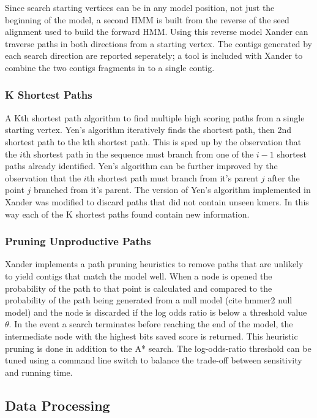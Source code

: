 \documentclass[10pt]{bmc_article}
\newenvironment{bmcformat}{\begin{raggedright}\baselineskip20pt\sloppy\setboolean{publ}{false}}{\end{raggedright}\baselineskip20pt\sloppy}
\begin{document}
\begin{bmcformat}
Since search starting vertices can be in any model position, not just the beginning of the model, a second HMM is built from the reverse of the seed alignment used to build the forward HMM.  Using this reverse model Xander can traverse paths in both directions from a starting vertex.  The contigs generated by each search direction are reported seperately; a tool is included with Xander to combine the two contigs fragments in to a single contig.

\subsubsection*{K Shortest Paths}
A Kth shortest path algorithm\cite{yen_finding_1971} to find multiple high scoring paths from a single starting vertex.  Yen's algorithm iteratively finds the shortest path, then 2nd shortest path to the kth shortest path.  This is sped up by the observation that the $i$th shortest path in the sequence must branch from one of the $i-1$ shortest paths already identified.  Yen's algorithm can be further improved by the observation that the $i$th shortest path must branch from it's parent $j$ after the point $j$ branched from it's parent\cite{lawler_procedure_1972}.  The version of Yen's algorithm implemented in Xander was modified to discard paths that did not contain unseen kmers.  In this way each of the K shortest paths found contain new information.

\subsubsection*{Pruning Unproductive Paths}
Xander implements a path pruning heuristics to remove paths that are unlikely to yield contigs that match the model well.  When a node is opened the probability of the path to that point is calculated and compared to the probability of the path being generated from a null model (cite hmmer2 null model) and the node is discarded if the log odds ratio is below a threshold value $\theta$. In the event a search terminates before reaching the end of the model, the intermediate node with the highest bits saved score is returned.  This heuristic pruning is done in addition to the A* search. The log-odds-ratio threshold can be tuned using a command line switch to balance the trade-off between sensitivity and running time.

\subsection*{Data Processing}

\end{bmcformat}
\end{document}
